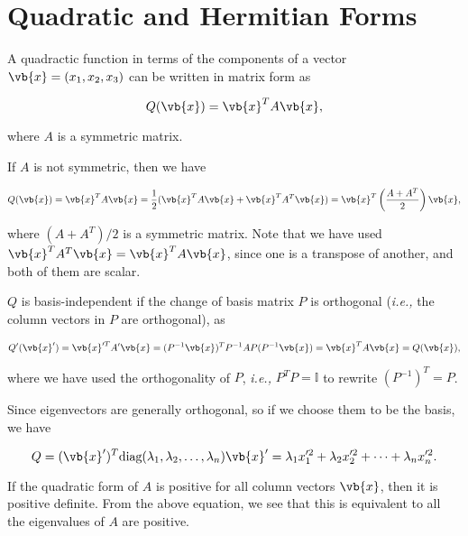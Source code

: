 \documentclass[a4paper,12pt]{report}
\begin{document}
\section{Quadratic and Hermitian Forms}

A quadractic function in terms of the components of a vector \(\vb{x} = (x_1 ,x_2 ,x_3 )\) can be written in matrix form as 

\begin{equation}
    Q(\vb{x} ) = \vb{x} ^T A\vb{x} ,
\end{equation}

where \(A\) is a symmetric matrix.

If \(A\) is not symmetric, then we have

\begin{equation}
    Q(\vb{x} ) = \vb{x} ^T A \vb{x} = \frac{1}{2} (\vb{x} ^TA\vb{x} + \vb{x} ^TA^T\vb{x} ) = \vb{x} ^T\left( \frac{A+A^T}{2}  \right)\vb{x},
\end{equation}

where \((A+A^T) /2\) is a symmetric matrix. Note that we have used \(\vb{x} ^T A^T\vb{x} = \vb{x} ^T A \vb{x} \), since one is a transpose of another, and both of them are scalar.  

\(Q\) is basis-independent if the change of basis matrix \(P\) is orthogonal (\textit{i.e.,} the column vectors in \(P\) are orthogonal), as 

\begin{equation}
    Q'(\vb{x} ') = \vb{x} '^TA'\vb{x} = (P^{-1} \vb{x} )^TP^{-1} AP(P^{-1} \vb{x} ) = \vb{x} ^TA\vb{x} = Q(\vb{x} ),
\end{equation}

where we have used the orthogonality of \(P\), \textit{i.e.,} \(P^TP = \mathbb{I}\) to rewrite \((P^{-1} )^T = P\).

Since eigenvectors are generally orthogonal, so if we choose them to be the basis, we have 

\begin{equation}
    Q = (\vb{x}') ^T\text{diag}(\lambda _{1},\lambda _{2}, \ldots ,\lambda _{n}   )\vb{x} ' = \lambda _{1}x'^2_1+ \lambda _{2}x'^2_2  + \cdots + \lambda _{n}x'^2_{n} .    
\end{equation}

If the quadratic form of \(A\) is positive for all column vectors \(\vb{x} \), then it is positive definite. From the above equation, we see that this is equivalent to all the eigenvalues of \(A\) are positive.  
\end{document}
